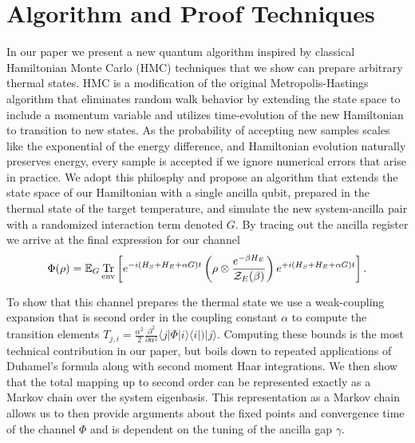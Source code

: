 \documentclass[
11pt,
 amsmath,amssymb,
 aps,
onecolumn, 
nofootinbib]{revtex4-2}
\newcommand{\ket}[1]{|#1\rangle}
\newcommand{\bra}[1]{\langle #1|}
\newcommand{\ketbra}[2]{| #1\rangle\! \langle #2|}
\newcommand{\brackets}[1]{\left[ #1 \right]}
\DeclareMathOperator{\Tr}{Tr}
\newcommand{\partrace}[2]{\Tr_{#1} \brackets{ #2 }}
\newcommand{\partfun}{\mathcal{Z}}
\begin{document}
\section{Algorithm and Proof Techniques}
In our paper we present a new quantum algorithm inspired by classical Hamiltonian Monte Carlo (HMC) techniques that we show can prepare arbitrary thermal states. HMC is a modification of the original Metropolis-Hastings algorithm that eliminates random walk behavior by extending the state space to include a momentum variable and utilizes time-evolution of the new Hamiltonian to transition to new states. As the probability of accepting new samples scales like the exponential of the energy difference, and Hamiltonian evolution naturally preserves energy, every sample is accepted if we ignore numerical errors that arise in practice. We adopt this philosphy and propose an algorithm that extends the state space of our Hamiltonian with a single ancilla qubit, prepared in the thermal state of the target temperature, and simulate the new system-ancilla pair with a randomized interaction term denoted $G$. By tracing out the ancilla register we arrive at the final expression for our channel 
\begin{equation}
    \Phi(\rho) = \mathbb{E}_G \partrace{\rm env}{e^{-i(H_S + H_E + \alpha G) t} \left( \rho \otimes \frac{e^{-\beta H_E}}{\partfun_E(\beta)} \right) e^{+i(H_S + H_E + \alpha G) t} }.
\end{equation}

To show that this channel prepares the thermal state we use a weak-coupling expansion that is second order in the coupling constant $\alpha$ to compute the transition elements $T_{j, i} =  \frac{\alpha^2}{2} \frac{\partial^2}{\partial \alpha^2}\bra{j} \Phi\ketbra{i}{i}) \ket{j}$. Computing these bounds is the most technical contribution in our paper, but boils down to repeated applications of Duhamel's formula along with second moment Haar integrations. We then show that the total mapping up to second order can be represented exactly as a Markov chain over the system eigenbasis. This representation as a Markov chain allows us to then provide arguments about the fixed points and convergence time of the channel $\Phi$ and is dependent on the tuning of the ancilla gap $\gamma$.
\end{document}
